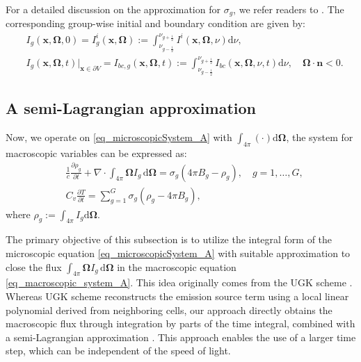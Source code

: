 \documentclass[preprint,12pt]{elsarticle}
\theoremstyle{definition}
\theoremstyle{plain}
\numberwithin{equation}{section}
\numberwithin{algorithm}{section}
\newcounter{eq_count}
\newcounter{subeq_count}
\newcounter{tab_count}
\newcommand{\half}{\frac{1}{2}}
\newcommand{\vOmega}{\mathbf{\Omega}}
\newcommand{\vx}{\mathbf{x}}
\newcommand{\dd}{{\text{d}}}
\newcommand{\pdrv}[2]{\frac{\partial{#1}}{\partial{#2}}}
\begin{document}
 For a detailed discussion on the approximation for $\sigma_g$, we refer readers to \cite{ pomraning2005equations,ZHANG2023112368}. The corresponding group-wise initial and boundary condition are given by:
   \begin{equation} 
        \begin{aligned}
               &I_{g}(\vx, \vOmega, 0) = I_{g}^i(\vx, \vOmega) :=  \int_{\nu_{g-\half}}^{\nu_{g+\half}} I^{i}(\vx,\vOmega,\nu) \dd{\nu}, \\[8pt]
               &I_{g}(\vx, \vOmega, t)\big|_{\vx \in \partial V} = I_{bc,g}(\vx, \vOmega, t):=  \int_{\nu_{g-\half}}^{\nu_{g+\half}}  I_{bc}(\vx,\vOmega,\nu,t) \dd{\nu}, \quad \vOmega \cdot \mathbf{n} < 0.
        \end{aligned}
    \end{equation}


\subsection{A semi-Lagrangian approximation} \label{Sec_SL}
Now, we  operate on  \eqref{eq_microscopicSystem_A} with  $\int_{4 \pi} (\cdot) \dd{\vOmega}$, the  system for macroscopic variables can be expressed as:
    \begin{subequations} \label{eq_macroscopic_system}
		\begin{align}
        \label{eq_macroscopic_system_A}
			&\frac{1}{c} \frac{\partial \rho_g}{\partial t}+\nabla \cdot \int_{4 \pi} \vOmega I_g \, \dd{\vOmega} = \sigma_{g} ( 4 \pi B_g-\rho_g ) , \quad  g=1, \ldots , G, \\  
			&C_v \pdrv{T}{t}=\sum_{g=1}^{G} \sigma_{g} \left( \rho_g- 4 \pi B_g \right),
		\end{align}
    \end{subequations} 
    where $\rho_g := \int_{4 \pi} I_g \dd{\vOmega} $.
    
The primary objective of this subsection is to utilize the  integral form of the microscopic equation \eqref{eq_microscopicSystem_A} with suitable approximation to close the flux $\int_{4 \pi} \vOmega I_g \, \mathrm{d}\vOmega$ in the macroscopic equation \eqref{eq_macroscopic_system_A}. This idea originally comes from the UGK scheme \cite{xu2010unified,mieussens2013asymptotic}. Whereas UGK scheme reconstructs the emission source term using a local linear polynomial derived from neighboring cells, our approach directly obtains the macroscopic flux through integration by parts of the time integral, combined with a semi-Lagrangian approximation \cite{shi2023efficient,zhang2023asymptotic,cai2024asymptotic}. This approach enables the use of a larger time step, which can be independent of the speed of light.
\end{document}
